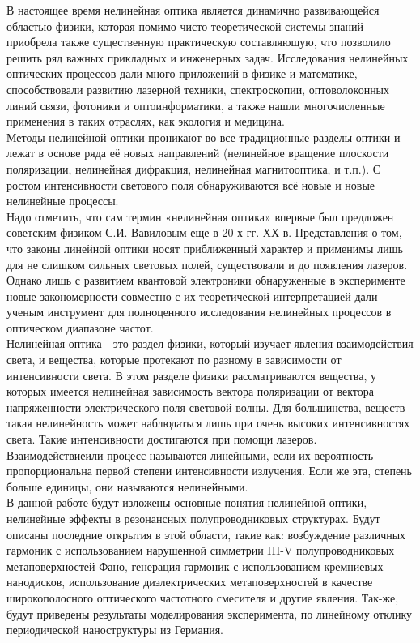 \hspace*{2mm}
В настоящее время нелинейная оптика является динамично развивающейся областью физики, которая помимо чисто теоретической системы знаний приобрела также существенную практическую составляющую, что позволило решить ряд важных прикладных и инженерных задач. Исследования нелинейных оптических процессов дали много приложений в физике и математике, способствовали развитию лазерной техники, спектроскопии, оптоволоконных линий связи, фотоники и оптоинформатики, а также нашли многочисленные применения в таких отраслях, как экология и медицина.
\\
\hspace*{2mm}
Методы нелинейной оптики проникают во все традиционные разделы оптики и лежат в основе ряда её новых направлений (нелинейное вращение плоскости поляризации, нелинейная дифракция, нелинейная магнитооптика, и т.п.). С ростом интенсивности светового поля обнаруживаются всё новые и новые нелинейные процессы.
\\
\hspace*{2mm}
Надо отметить, что сам термин «нелинейная оптика» впервые был предложен советским
физиком С.И. Вавиловым еще в 20-х гг. ХХ в. Представления о том, что законы линейной оптики носят приближенный характер и применимы лишь для не слишком сильных световых полей, существовали и до появления лазеров. Однако лишь с развитием квантовой электроники обнаруженные в эксперименте новые закономерности совместно с их теоретической интерпретацией дали ученым инструмент для полноценного исследования нелинейных процессов в оптическом диапазоне частот.
\\
\hspace*{2mm}
\underline{Нелинейная оптика} - это раздел физики, который изучает явления взаимодействия света, и вещества, которые протекают по разному в зависимости от интенсивности света. В этом разделе физики рассматриваются вещества, у которых имеется нелинейная зависимость вектора поляризации от вектора напряженности электрического поля световой волны. Для большинства, веществ такая нелинейность может наблюдаться лишь при очень высоких интенсивностях света. Такие интенсивности достигаются при помощи лазеров. Взаимодействиеили процесс называются линейными, если их вероятность пропорциональна первой степени интенсивности излучения. Если же эта, степень больше единицы, они называются нелинейными.
\\
\hspace*{2mm}
В данной работе будут изложены основные понятия нелинейной оптики, нелинейные эффекты в резонансных полупроводниковых структурах. Будут описаны последние открытия в этой области, такие как: возбуждение различных гармоник с использованием нарушенной симметрии III-V полупроводниковых метаповерхностей Фано, генерация гармоник с использованием кремниевых нанодисков, использование диэлектрических метаповерхностей в качестве широкополосного оптического частотного смесителя и другие явления. Так-же, будут приведены результаты моделирования эксперимента, по линейному отклику периодической наноструктуры из Германия.
